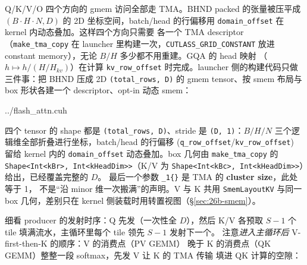 Q/K/V/O 四个方向的 gmem 访问全部走 TMA。BHND packed 的张量被压平成
$(B\cdot H\cdot N, D)$ 的 2D 坐标空间，batch/head 的行偏移用
\texttt{domain\_\allowbreak{}offset} 在 kernel 内动态叠加。这样四个方向只需要
各一个 TMA descriptor（\texttt{make\_\allowbreak{}tma\_\allowbreak{}copy} 在
launcher 里构建一次，\texttt{CUTLASS\_\allowbreak{}GRID\_\allowbreak{}CONSTANT}
放进 constant memory），无论 $B/H$ 多少都不用重建。GQA 的 head 映射
（$h \mapsto h/(H/H_{kv})$）在计算 \texttt{kv\_\allowbreak{}row\_\allowbreak{}offset}
时完成。launcher 侧的构建代码只做三件事：把 BHND 压成 2D
\texttt{(total\_rows, D)} 的 gmem tensor、按 smem 布局与 box 形状各建一个
descriptor、opt-in 动态 smem：

\begin{lstinputlisting}[linerange={4104-4128},firstnumber=auto,
  title={flash\_attn.cuh L4104-4128（launcher：BHND$\to$2D 压平 + 四方向 TMA descriptor）}]{../flash_attn.cuh}
\end{lstinputlisting}

四个 tensor 的 shape 都是 \texttt{(total\_rows, D)}、stride 是
\texttt{(D, 1)}：$B/H/N$ 三个逻辑维全部折叠进行坐标，batch/head 的行偏移
(\texttt{q\_\allowbreak{}row\_\allowbreak{}offset}/\texttt{kv\_\allowbreak{}row\_\allowbreak{}offset}) 留给 kernel 内的
\texttt{domain\_\allowbreak{}offset} 动态叠加。box 几何由 \texttt{make\_tma\_copy}
的 \texttt{Shape<Int<kBr>, Int<kHeadDim>>}（K/V 为
\texttt{Shape<Int<kBc>, Int<kHeadDim>>}）给出，已经覆盖完整的 $D$。
最后一个参数 \texttt{\_1\{\}} 是 TMA 的 \textbf{cluster size}，此处等于 1，
不是“沿 minor 维一次搬满”的声明。V 与 K 共用 \texttt{SmemLayoutKV} 与同一
box 几何，差别只在 kernel 侧装载时用转置视图（\S\ref{sec:26b-smem}）。

细看 producer 的发射时序：Q 先发（一次性全 $D$），然后
K/V 各预取 $S{-}1$ 个 tile 填满流水，主循环里每个 tile 领先 $S{-}1$ 发射下一个。
注意\emph{进入主循环后} V-first-then-K 的顺序：V 的消费点（PV GEMM）
晚于 K 的消费点（QK GEMM）整整一段 softmax，先发 V 让 K 的 TMA 传输
填进 QK 计算的空隙：

